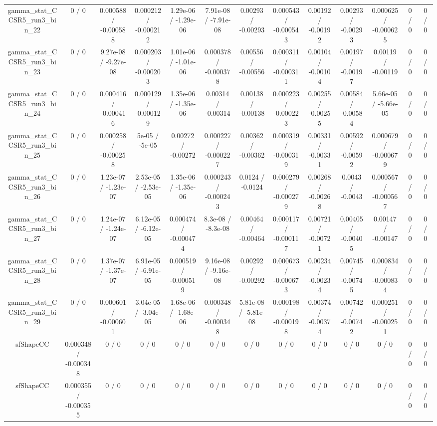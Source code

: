\documentclass[10pt]{article}
\begin{document}
\begin{table}[htbp]
\begin{center}
\begin{tabular}{|c|c|c|c|c|c|c|c|c|c|c|c|c|}
  gamma_stat_CCSR5_run3_bin_22 & 0 / 0 & 0.000588 / -0.000588 & 0.000212 / -0.000212 & 1.29e-06 / -1.29e-06 & 7.91e-08 / -7.91e-08 & 0.00293 / -0.00293 & 0.000543 / -0.000543 & 0.00192 / -0.00192 & 0.00293 / -0.00293 & 0.000625 / -0.000625 & 0 / 0 & 0 / 0 \\ 
  gamma_stat_CCSR5_run3_bin_23 & 0 / 0 & 9.27e-08 / -9.27e-08 & 0.000203 / -0.000203 & 1.01e-06 / -1.01e-06 & 0.000378 / -0.000378 & 0.00556 / -0.00556 & 0.000311 / -0.000311 & 0.00104 / -0.00104 & 0.00197 / -0.00197 & 0.00119 / -0.00119 & 0 / 0 & 0 / 0 \\ 
  gamma_stat_CCSR5_run3_bin_24 & 0 / 0 & 0.000416 / -0.000416 & 0.000129 / -0.000129 & 1.35e-06 / -1.35e-06 & 0.00314 / -0.00314 & 0.00138 / -0.00138 & 0.000223 / -0.000223 & 0.00255 / -0.00255 & 0.00584 / -0.00584 & 5.66e-05 / -5.66e-05 & 0 / 0 & 0 / 0 \\ 
  gamma_stat_CCSR5_run3_bin_25 & 0 / 0 & 0.000258 / -0.000258 & 5e-05 / -5e-05 & 0.00272 / -0.00272 & 0.000227 / -0.000227 & 0.00362 / -0.00362 & 0.000319 / -0.000319 & 0.00331 / -0.00331 & 0.00592 / -0.00592 & 0.000679 / -0.000679 & 0 / 0 & 0 / 0 \\ 
  gamma_stat_CCSR5_run3_bin_26 & 0 / 0 & 1.23e-07 / -1.23e-07 & 2.53e-05 / -2.53e-05 & 1.35e-06 / -1.35e-06 & 0.000243 / -0.000243 & 0.0124 / -0.0124 & 0.000279 / -0.000279 & 0.00268 / -0.00268 & 0.0043 / -0.0043 & 0.000567 / -0.000567 & 0 / 0 & 0 / 0 \\ 
  gamma_stat_CCSR5_run3_bin_27 & 0 / 0 & 1.24e-07 / -1.24e-07 & 6.12e-05 / -6.12e-05 & 0.000474 / -0.000474 & 8.3e-08 / -8.3e-08 & 0.00464 / -0.00464 & 0.000117 / -0.000117 & 0.00721 / -0.00721 & 0.00405 / -0.00405 & 0.00147 / -0.00147 & 0 / 0 & 0 / 0 \\ 
  gamma_stat_CCSR5_run3_bin_28 & 0 / 0 & 1.37e-07 / -1.37e-07 & 6.91e-05 / -6.91e-05 & 0.000519 / -0.000519 & 9.16e-08 / -9.16e-08 & 0.00292 / -0.00292 & 0.000673 / -0.000673 & 0.00234 / -0.00234 & 0.00745 / -0.00745 & 0.000834 / -0.000834 & 0 / 0 & 0 / 0 \\ 
  gamma_stat_CCSR5_run3_bin_29 & 0 / 0 & 0.000601 / -0.000601 & 3.04e-05 / -3.04e-05 & 1.68e-06 / -1.68e-06 & 0.000348 / -0.000348 & 5.81e-08 / -5.81e-08 & 0.000198 / -0.000198 & 0.00374 / -0.00374 & 0.00742 / -0.00742 & 0.000251 / -0.000251 & 0 / 0 & 0 / 0 \\ 
  sfShapeCC & 0.000348 / -0.000348 & 0 / 0 & 0 / 0 & 0 / 0 & 0 / 0 & 0 / 0 & 0 / 0 & 0 / 0 & 0 / 0 & 0 / 0 & 0 / 0 & 0 / 0 \\ 
  sfShapeCC & 0.000355 / -0.000355 & 0 / 0 & 0 / 0 & 0 / 0 & 0 / 0 & 0 / 0 & 0 / 0 & 0 / 0 & 0 / 0 & 0 / 0 & 0 / 0 & 0 / 0 \\ 

\end{tabular}
\end{center}
\end{table}
\end{document}
